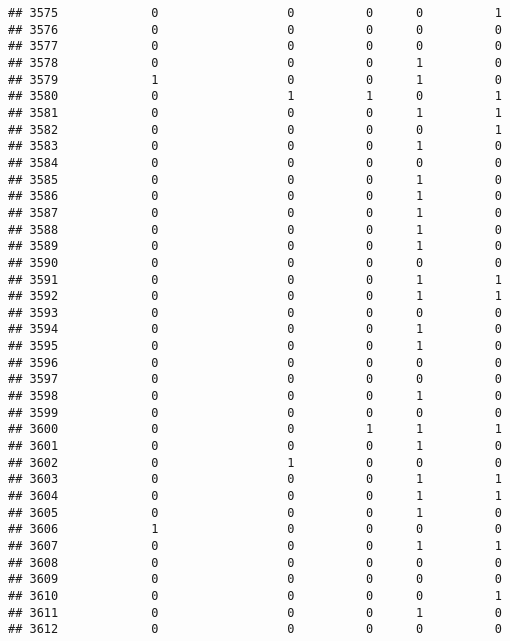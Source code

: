 \documentclass[
]{article}
\begin{document}
\begin{verbatim}
## 3575             0                  0          0      0          1
## 3576             0                  0          0      0          0
## 3577             0                  0          0      0          0
## 3578             0                  0          0      1          0
## 3579             1                  0          0      1          0
## 3580             0                  1          1      0          1
## 3581             0                  0          0      1          1
## 3582             0                  0          0      0          1
## 3583             0                  0          0      1          0
## 3584             0                  0          0      0          0
## 3585             0                  0          0      1          0
## 3586             0                  0          0      1          0
## 3587             0                  0          0      1          0
## 3588             0                  0          0      1          0
## 3589             0                  0          0      1          0
## 3590             0                  0          0      0          0
## 3591             0                  0          0      1          1
## 3592             0                  0          0      1          1
## 3593             0                  0          0      0          0
## 3594             0                  0          0      1          0
## 3595             0                  0          0      1          0
## 3596             0                  0          0      0          0
## 3597             0                  0          0      0          0
## 3598             0                  0          0      1          0
## 3599             0                  0          0      0          0
## 3600             0                  0          1      1          1
## 3601             0                  0          0      1          0
## 3602             0                  1          0      0          0
## 3603             0                  0          0      1          1
## 3604             0                  0          0      1          1
## 3605             0                  0          0      1          0
## 3606             1                  0          0      0          0
## 3607             0                  0          0      1          1
## 3608             0                  0          0      0          0
## 3609             0                  0          0      0          0
## 3610             0                  0          0      0          1
## 3611             0                  0          0      1          0
## 3612             0                  0          0      0          0

\end{verbatim}
\end{document}
